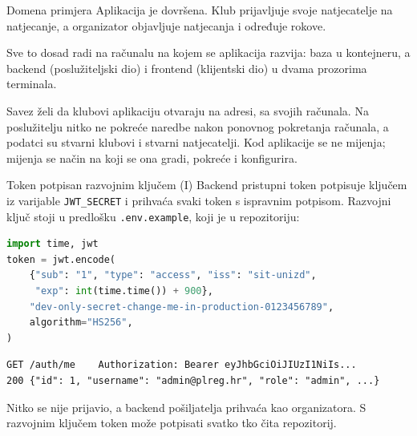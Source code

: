 \begin{frame}{Domena primjera}
Aplikacija je dovršena. Klub prijavljuje svoje natjecatelje na natjecanje, a organizator objavljuje natjecanja i određuje rokove.

\vspace{0.9em}
Sve to dosad radi na računalu na kojem se aplikacija razvija: baza u kontejneru, a backend (poslužiteljski dio) i frontend (klijentski dio) u dvama prozorima terminala.

\vspace{0.9em}
Savez želi da klubovi aplikaciju otvaraju na adresi, sa svojih računala. Na poslužitelju nitko ne pokreće naredbe nakon ponovnog pokretanja računala, a podatci su stvarni klubovi i stvarni natjecatelji. Kod aplikacije se ne mijenja; mijenja se način na koji se ona gradi, pokreće i konfigurira.
\end{frame}

\begin{frame}[fragile]{Token potpisan razvojnim ključem (I)}
Backend pristupni token potpisuje ključem iz varijable \texttt{JWT\_SECRET} i prihvaća svaki token s ispravnim potpisom. Razvojni ključ stoji u predlošku \texttt{.env.example}, koji je u repozitoriju:

\begin{lstlisting}[language=python]
import time, jwt
token = jwt.encode(
    {"sub": "1", "type": "access", "iss": "sit-unizd",
     "exp": int(time.time()) + 900},
    "dev-only-secret-change-me-in-production-0123456789",
    algorithm="HS256",
)
\end{lstlisting}

\begin{lstlisting}
GET /auth/me    Authorization: Bearer eyJhbGciOiJIUzI1NiIs...
200 {"id": 1, "username": "admin@plreg.hr", "role": "admin", ...}
\end{lstlisting}

\vspace{0.2em}
Nitko se nije prijavio, a backend pošiljatelja prihvaća kao organizatora. S razvojnim ključem token može potpisati svatko tko čita repozitorij.
\end{frame}

